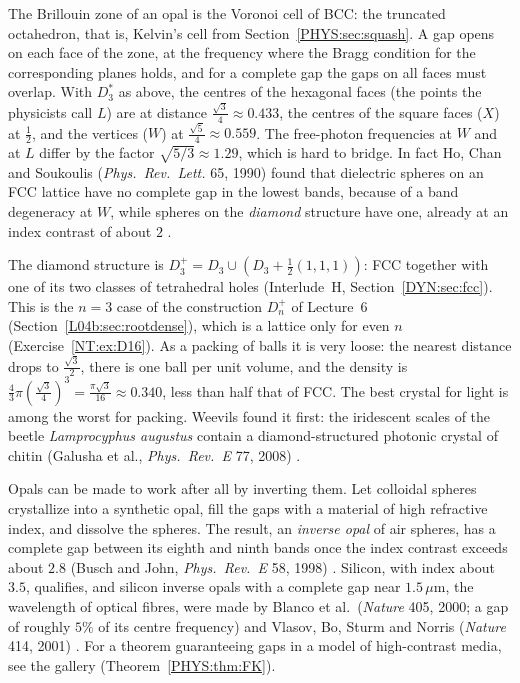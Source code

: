 \documentclass[11pt,openany]{book}
\theoremstyle{plain}
\theoremstyle{definition}
\theoremstyle{remark}
\begin{document}
The Brillouin zone of an opal is the Voronoi cell of BCC: the truncated octahedron, that is,
Kelvin's cell from Section~\ref{PHYS:sec:squash}. A gap opens on each face of the zone, at the frequency where
the Bragg condition for the corresponding planes holds, and for a complete gap the gaps on all faces must
overlap. With $D_3^*$ as above, the centres of the hexagonal faces (the points the physicists call $L$) are
at distance $\frac{\sqrt3}4\approx0.433$, the centres of the square faces ($X$) at $\frac12$, and the
vertices ($W$) at $\frac{\sqrt5}4\approx0.559$. The free-photon frequencies at $W$ and at $L$ differ by the factor
$\sqrt{5/3}\approx1.29$, which is hard to bridge. In fact Ho, Chan and Soukoulis (\emph{Phys.\ Rev.\ Lett.} 65,
1990) found that dielectric spheres on an FCC lattice have no complete gap in the lowest bands, because
of a band degeneracy at $W$, while spheres on the \emph{diamond} structure have one, already at an
index contrast of about $2$ .

The diamond structure is $D_3^+=D_3\cup(D_3+\frac12(1,1,1))$: FCC together with one of its two classes of
tetrahedral holes (Interlude~H, Section~\ref{DYN:sec:fcc}). This is the $n=3$ case of the construction
$D_n^+$ of Lecture~6 (Section~\ref{L04b:sec:rootdense}), which is a lattice only for even $n$
(Exercise~\ref{NT:ex:D16}). As a packing of balls it is very loose: the nearest distance drops to
$\frac{\sqrt3}2$, there is one ball per unit volume, and the density is
$\frac43\pi(\frac{\sqrt3}4)^3=\frac{\pi\sqrt3}{16}\approx0.340$, less than half that of FCC. The best crystal
for light is among the worst for packing. Weevils found it first: the iridescent scales of the beetle
\emph{Lamprocyphus augustus} contain a diamond-structured photonic crystal of chitin (Galusha et al.,
\emph{Phys.\ Rev.~E} 77, 2008) .

Opals can be made to work after all by inverting them. Let colloidal spheres crystallize into a synthetic
opal, fill the gaps with a material of high refractive index, and dissolve the spheres. The result, an
\emph{inverse opal} of air spheres, has a complete gap between its eighth and ninth bands once the index
contrast exceeds about $2.8$ (Busch and John, \emph{Phys.\ Rev.~E} 58, 1998) .
Silicon, with index about $3.5$, qualifies, and silicon inverse opals with a complete gap near
$1.5\,\mu$m, the wavelength of optical fibres, were made by Blanco et al.\ (\emph{Nature} 405, 2000; a gap of
roughly $5\%$ of its centre frequency) and Vlasov, Bo, Sturm and Norris (\emph{Nature} 414, 2001) .
For a theorem guaranteeing gaps in a model of high-contrast media, see the gallery
(Theorem~\ref{PHYS:thm:FK}).
\end{document}
